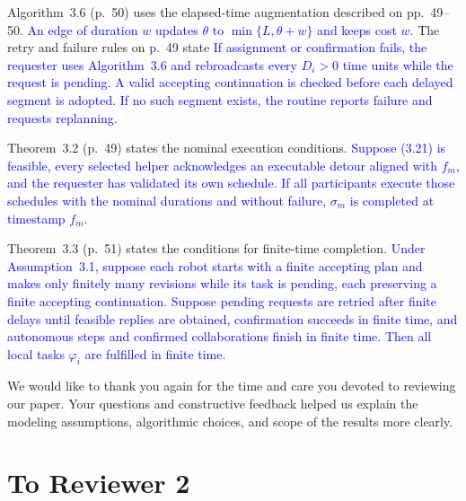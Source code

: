 \documentclass[11pt]{article}
\newcommand{\change}[1]{\textcolor{blue}{#1}}
\begin{document}
\begin{itemize}
Algorithm~3.6 (p.~50) uses the elapsed-time augmentation described on pp.~49--50.
\change{An edge of duration $w$ updates $\theta$ to $\min\{L,\theta+w\}$ and keeps
cost $w$.}
The retry and failure rules on p.~49 state
\change{If assignment or confirmation fails, the requester uses Algorithm~3.6
and rebroadcasts every $D_i>0$ time units while the request is pending.
A valid accepting continuation is checked before each delayed segment is adopted.
If no such segment exists, the routine reports failure and requests replanning.}

Theorem~3.2 (p.~49) states the nominal execution conditions.
\change{Suppose (3.21) is feasible, every selected helper acknowledges
an executable detour aligned with $f_m$, and the requester has validated its
own schedule. If all participants execute those schedules with the nominal
durations and without failure, $\sigma_m$ is completed at timestamp $f_m$.}

Theorem~3.3 (p.~51) states the conditions for finite-time completion.
\change{Under Assumption~3.1, suppose each robot starts with a
finite accepting plan and makes only finitely many revisions while its task
is pending, each preserving a finite accepting continuation. Suppose pending
requests are retried after finite delays until feasible replies are obtained,
confirmation succeeds in finite time, and autonomous steps and confirmed
collaborations finish in finite time. Then all local tasks
$\varphi_i$ are fulfilled in finite time.}
\end{itemize}

We would like to thank you again for the time and care you devoted to
reviewing our paper. Your questions and constructive feedback helped us explain
the modeling assumptions, algorithmic choices, and scope of the results more
clearly.

\newpage
\section*{To Reviewer 2}
\end{document}
